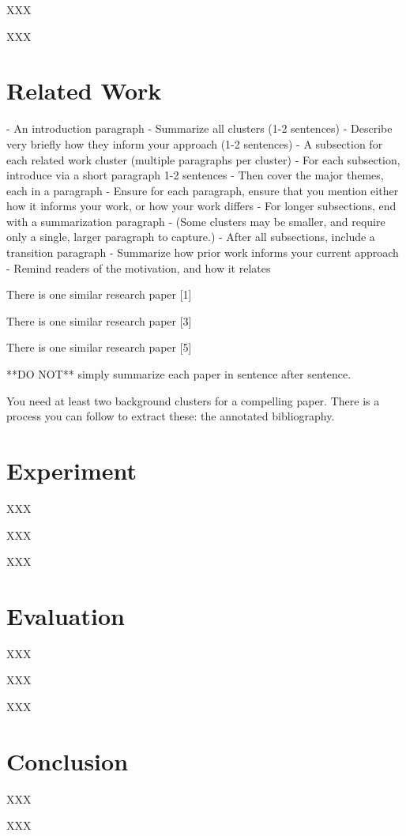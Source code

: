 \documentclass[10pt,journal,compsoc]{IEEEtran}
\begin{document}
XXX

XXX

\section{Related Work}
\large

- An introduction paragraph 
    - Summarize all clusters (1-2 sentences)
    - Describe very briefly how they inform your approach (1-2 sentences)
- A subsection for each related work cluster (multiple paragraphs per cluster)
    - For each subsection, introduce via a short paragraph 1-2 sentences
    - Then cover the major themes, each in a paragraph
    - Ensure for each paragraph, ensure that you mention either how it informs your work, or how your work differs
    - For longer subsections, end with a summarization paragraph
    - (Some clusters may be smaller, and require only a single, larger paragraph to capture.)
- After all subsections, include a transition paragraph
  - Summarize how prior work informs your current approach
  - Remind readers of the motivation, and how it relates

There is one similar research paper [1] 

There is one similar research paper [3] 

There is one similar research paper [5] 

**DO NOT** simply summarize each paper in sentence after sentence.

You need at least two background clusters for a compelling paper.
There is a process you can follow to extract these: the annotated bibliography.

\section{Experiment}
\large
XXX

XXX

XXX

\section{Evaluation}
\large
XXX

XXX

XXX

\section{Conclusion}
\large
XXX

XXX
\end{document}
